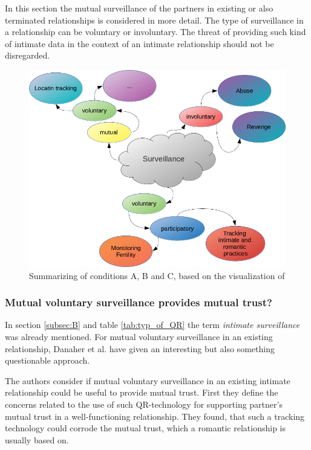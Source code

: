 In this section the mutual surveillance of the partners in existing or also terminated relationships is considered in more detail. 
The type of surveillance in a relationship can be voluntary or involuntary. The threat of providing such kind of intimate data in the context of an intimate relationship should not be disregarded.
\begin{figure}[htb]
	\centering
	\includegraphics[width=\linewidth]{img/differences_surveillance.png}
	\caption{Summarizing of conditions A, B and C, based on the visualization of \cite{ethicsOfSurveillance}}
	\label{fig:intimate_surveillance}
\end{figure}

\subsubsection{Mutual voluntary surveillance provides mutual trust?}
In section \ref{subsec:B} and table \ref{tab:typ_of_QR} the term \textit{intimate surveillance} was already mentioned.
For mutual voluntary surveillance in an existing relationship, Danaher et al. \cite{doi:10.1080/15265161.2017.1409823} have given an interesting but also something questionable approach.

The authors consider if mutual voluntary surveillance in an existing intimate relationship could be useful to provide mutual trust.
First they define the concerns related to the use of such \acs{QR}-technology for supporting partner's mutual trust in a well-functioning relationship. They found, that such a tracking technology could corrode the mutual trust, which a romantic relationship is usually based on.

